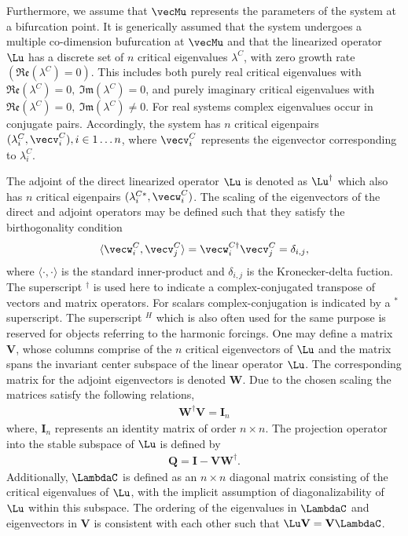 Furthermore, we assume that $\vecMu$ represents the parameters of the system at a bifurcation point. It is generically assumed that the system undergoes a multiple co-dimension bufurcation at $\vecMu$ and that the linearized operator $\Lu$ has a discrete set of $n$ critical eigenvalues $\lambda^{C}$, with zero growth rate $(\mathfrak{Re}(\lambda^{C}) = 0)$. This includes both purely real critical eigenvalues with $\mathfrak{Re}(\lambda^{C}) = 0,\ \mathfrak{Im}(\lambda^{C}) = 0$, and purely imaginary critical eigenvalues with $\mathfrak{Re}(\lambda^{C}) = 0,\ \mathfrak{Im}(\lambda^{C}) \ne 0$. For real systems complex eigenvalues occur in conjugate pairs. Accordingly, the system has $n$ critical eigenpairs $(\lambda^{C}_{i},\vecv^{C}_{i}), i\in 1\ldots n$, where $\vecv^{C}_{i}$ represents the eigenvector corresponding to $\lambda^{C}_{i}$. 

The adjoint of the direct linearized operator $\Lu$ is denoted as $\Lu^{\dagger}$ which also has $n$ critical eigenpairs $(\lambda^{C*}_{i}, \vecw^{C}_{i})$. The scaling of the eigenvectors of the direct and adjoint operators may be defined such that they satisfy the birthogonality condition
\begin{eqnarray}
	\langle\vecw^{C}_{i},\vecv^{C}_{j}\rangle = \vecw^{C\dagger}_{i}\vecv^{C}_{j} = \delta_{i,j} \label{eqn:std_biorthogonality},
\end{eqnarray}
where $\langle\cdot,\cdot\rangle$ is the standard inner-product and $\delta_{i,j}$ is the Kronecker-delta fuction. The superscript $^{\dagger}$ is used here to indicate a complex-conjugated transpose of vectors and matrix operators. For scalars complex-conjugation is indicated by a $^{*}$ superscript. The superscript $^{H}$ which is also often used for the same purpose is reserved for objects referring to the harmonic forcings. One may define a matrix $\mathbf{V}$, whose columns comprise of the $n$ critical eigenvectors of $\Lu$ and the matrix spans the invariant center subspace of the linear operator $\Lu$. The corresponding matrix for the adjoint eigenvectors is denoted $\mathbf{W}$. Due to the chosen scaling the matrices satisfy the following relations,
\begin{align}
	\label{eqn:biorthogonal_matrices}
	\mathbf{W}^{\dagger}\mathbf{V} = \mathbf{I}_{n}
\end{align}
where, $\mathbf{I}_{n}$ represents an identity matrix of order $n\times n$. The projection operator  into the stable subspace of $\Lu$ is defined by
\begin{eqnarray}
	\label{eqn:stable_projector}
	\mathbf{Q} = \mathbf{I} - \mathbf{V}\mathbf{W}^{\dagger}.
\end{eqnarray}
Additionally, $\LambdaC$ is defined as an $n\times n$ diagonal matrix consisting of the critical eigenvalues of $\Lu$, with the implicit assumption of diagonalizability of $\Lu$ within this subspace. The ordering of the eigenvalues in $\LambdaC$ and eigenvectors in $\mathbf{V}$ is consistent with each other such that $\Lu\mathbf{V} = \mathbf{V}\LambdaC$. 


